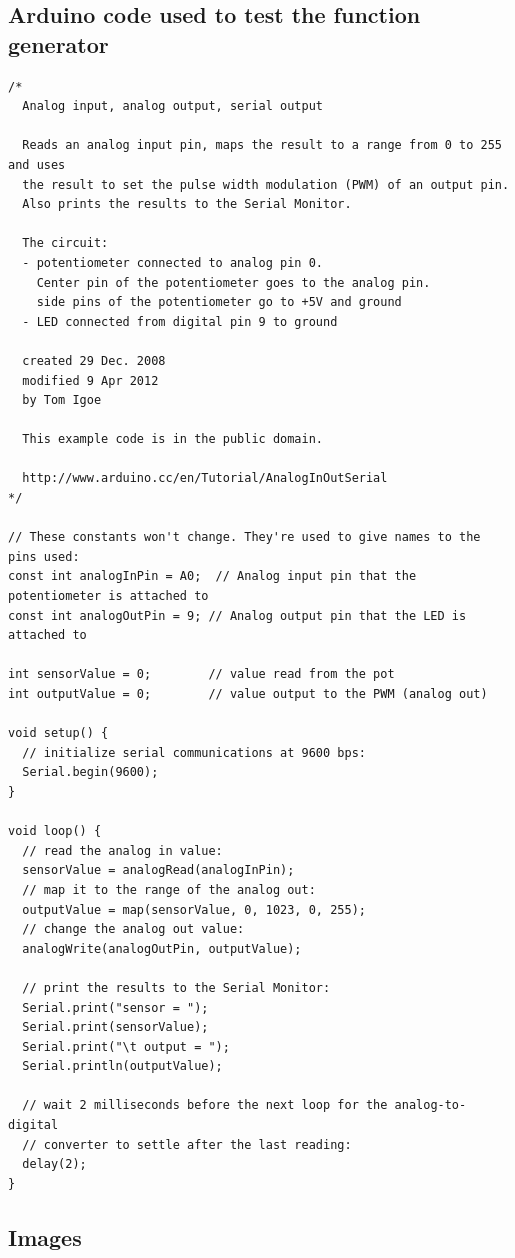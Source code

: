 \documentclass[12pt]{article}
\begin{document}
\subsection*{Arduino code used to test the function generator}
\begin{verbatim}
/*
  Analog input, analog output, serial output

  Reads an analog input pin, maps the result to a range from 0 to 255 and uses
  the result to set the pulse width modulation (PWM) of an output pin.
  Also prints the results to the Serial Monitor.

  The circuit:
  - potentiometer connected to analog pin 0.
    Center pin of the potentiometer goes to the analog pin.
    side pins of the potentiometer go to +5V and ground
  - LED connected from digital pin 9 to ground

  created 29 Dec. 2008
  modified 9 Apr 2012
  by Tom Igoe

  This example code is in the public domain.

  http://www.arduino.cc/en/Tutorial/AnalogInOutSerial
*/

// These constants won't change. They're used to give names to the pins used:
const int analogInPin = A0;  // Analog input pin that the potentiometer is attached to
const int analogOutPin = 9; // Analog output pin that the LED is attached to

int sensorValue = 0;        // value read from the pot
int outputValue = 0;        // value output to the PWM (analog out)

void setup() {
  // initialize serial communications at 9600 bps:
  Serial.begin(9600);
}

void loop() {
  // read the analog in value:
  sensorValue = analogRead(analogInPin);
  // map it to the range of the analog out:
  outputValue = map(sensorValue, 0, 1023, 0, 255);
  // change the analog out value:
  analogWrite(analogOutPin, outputValue);

  // print the results to the Serial Monitor:
  Serial.print("sensor = ");
  Serial.print(sensorValue);
  Serial.print("\t output = ");
  Serial.println(outputValue);

  // wait 2 milliseconds before the next loop for the analog-to-digital
  // converter to settle after the last reading:
  delay(2);
}
\end{verbatim}

\subsection*{Images}
\end{document}
